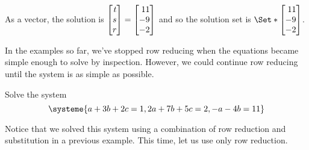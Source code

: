 \begin{example}
		As a vector, the solution is $\mat{t\\s\\r}=\mat{11\\-9\\-2}$ and so the solution set is $\Set*{\mat{11\\-9\\-2}}$.
	\end{example}

	In the examples so far, we've stopped row reducing when the equations became simple enough
	to solve by inspection. However, we could continue row reducing until the system is as simple as possible.

	\begin{example}
		Solve the system
		\[
			\systeme{
				a+3b+2c=1,
				2a+7b+5c=2,
				-a-4b=11
			}
		\]

		Notice that we solved this system using a combination of row reduction and substitution in a previous example.
		This time, let us use only row reduction.
		

\end{example}
